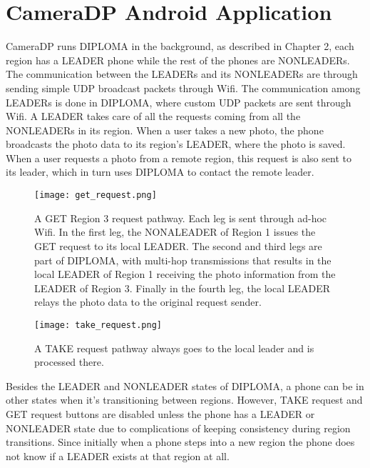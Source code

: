 \chapter{CameraDP Android Application}

CameraDP runs DIPLOMA in the background, as described in Chapter 2, each region has a LEADER phone while the rest of the phones are NONLEADERs. The communication between the LEADERs and its NONLEADERs are through sending simple UDP broadcast packets through Wifi. The communication among LEADERs is done in DIPLOMA, where custom UDP packets are sent through Wifi. A LEADER takes care of all the requests coming from all the NONLEADERs in its region.  When a user takes a new photo, the phone broadcasts the photo data to its region's LEADER, where the photo is saved. When a user requests a photo from a remote region, this request is also sent to its leader, which in turn uses DIPLOMA to contact the remote leader.

\begin{figure}[htb]
\begin{center}
\texttt{[image: get\_request.png]}
\caption{A GET Region 3 request pathway. Each leg is sent through ad-hoc Wifi. In the first leg, the NONALEADER of Region 1 issues the GET request to its local LEADER. The second and third legs are part of DIPLOMA, with multi-hop transmissions that results in the local LEADER of Region 1 receiving the photo information from the LEADER of Region 3. Finally in the fourth leg, the local LEADER relays the photo data to the original request sender.}
\label{fig:get-request-png}
\end{center}
\end{figure}

\begin{figure}[htb]
\begin{center}
\texttt{[image: take\_request.png]}
\caption{A TAKE request pathway always goes to the local leader and is processed there.}
\label{fig:take-request-png}
\end{center}
\end{figure}

Besides the LEADER and NONLEADER states of DIPLOMA, a phone can be in other states when it's transitioning between regions. However, TAKE request and GET request buttons are disabled unless the phone has a LEADER or NONLEADER state due to complications of keeping consistency during region transitions. Since initially when a phone steps into a new region the phone does not know if a LEADER exists at that region at all.

